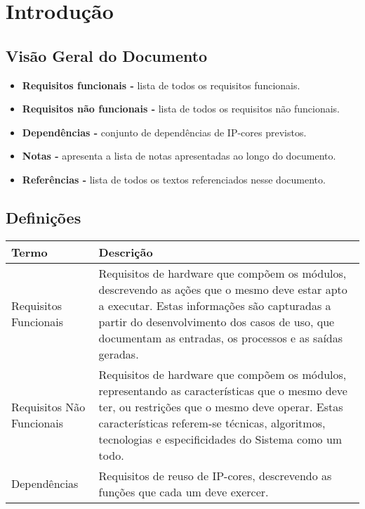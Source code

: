 \documentclass{article}
\begin{document}
\section{Introdução}

\subsection{Visão Geral do Documento}
  \begin{itemize}
   \item \textbf{Requisitos funcionais -} lista de todos os requisitos funcionais.
   \item \textbf{Requisitos não funcionais -} lista de todos os requisitos não funcionais.
   \item \textbf{Dependências -} conjunto de dependências de IP-cores previstos.
   \item \textbf{Notas -} apresenta a lista de notas apresentadas ao longo do documento.
   \item \textbf{Referências -} lista de todos os textos referenciados nesse documento.
  \end{itemize}

  \subsection{Definições}
    \FloatBarrier
    \begin{table}[H]
      \begin{center}
        \begin{tabular}[pos]{|m{5cm} | m{9cm}|} 
          \hline
          \cellcolor[gray]{0.9}\textbf{Termo} & \cellcolor[gray]{0.9}\textbf{Descrição} \\ \hline
          Requisitos Funcionais & Requisitos de hardware que compõem os módulos, descrevendo as ações que o mesmo deve estar apto a executar. Estas informações são capturadas a partir do desenvolvimento dos casos de uso, que documentam as entradas, os processos e as saídas geradas.  \\ \hline
          Requisitos Não Funcionais & Requisitos de hardware que compõem os módulos, representando as características que o mesmo deve ter, ou restrições que o mesmo deve operar. Estas características referem-se técnicas, algoritmos, tecnologias e especificidades do Sistema como um todo.  \\ \hline
          Dependências & Requisitos de reuso de IP-cores, descrevendo as funções que cada um deve exercer. \\ \hline
        \end{tabular}
      \end{center}
    \end{table}  
\end{document}
